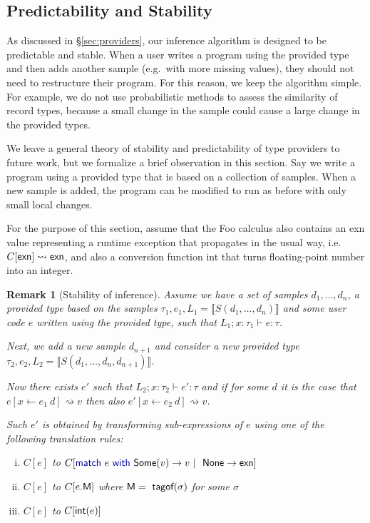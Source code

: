 \documentclass[pldi-cameraready]{sigplanconf-pldi16}
\newcommand{\kvd}[1]{\textnormal{\textcolor{kvdclr}{\sffamily #1}}}
\newcommand{\ident}[1]{\textnormal{\sffamily #1}}
\newcommand{\tytagof}{\ident{tagof}}
\newcommand{\reduce}{\rightsquigarrow}
\newcommand{\sem}[1]{\llbracket #1 \rrbracket}
\newcommand{\semalt}[1]{S(#1)}
\newtheorem{remark}{Remark}
\begin{document}

\subsection{Predictability and Stability}
\label{sec:impl-stable}

As discussed in \S\ref{sec:providers}, our inference algorithm is designed to be predictable
and stable. When a user writes a program using the provided type and then adds another sample
(e.g.~with more missing values), they should not need to restructure their program.
For this reason, we keep the algorithm simple. For example, we do not use probabilistic methods to
assess the similarity of record types, because a small change in the sample could cause a large change
in the provided types.

We leave a general theory of stability and predictability of type providers to future work, but
we formalize a brief observation in this section. Say we write a program using a provided type
that is based on a collection of samples. When a new sample is added, the program can be modified
to run as before with only small local changes.

For the purpose of this section, assume that the Foo calculus also contains an \ident{exn}
value representing a runtime exception that propagates in the usual way,
i.e.~$C[\ident{exn}]\reduce\ident{exn}$, and also a conversion function \ident{int} that
turns floating-point number into an integer.

\begin{remark}[Stability of inference]
Assume we have a set of samples $d_1, \ldots, d_n$, a provided type based on the samples
$\tau_1, e_1, L_1 = \sem{\semalt{d_1, \ldots, d_n}}$ and some user code $e$ written using
the provided type, such that $L_1; x:\tau_1\vdash e : \tau$.

Next, we add a new sample $d_{n+1}$ and consider a new provided type
$\tau_2, e_2, L_2 = \sem{\semalt{d_1, \ldots, d_n, d_{n+1}}}$.

Now there exists $e'$ such that $L_2; x:\tau_2\vdash e' : \tau$ and if
for some $d$ it is the case that $e[x\leftarrow e_1~d] \reduce v$ then
also $e'[x\leftarrow e_2~d] \reduce v$.

Such $e'$ is obtained by transforming sub-expressions of $e$ using one of the following
translation rules:
%
\begin{enumerate}[(i)]
\item
$C[e]$ to $C[\kvd{match}~e~\kvd{with}~\ident{Some}(v) \rightarrow v~|~\ident{None} \rightarrow \ident{exn}]$
\item
$C[e]$ to $C[e.\ident{M}]$ where $\ident{M} = \tytagof(\sigma)$ for some $\sigma$
\item
$C[e]$ to $C[\ident{int}(e)]$
\end{enumerate}
\end{remark}
\end{document}
